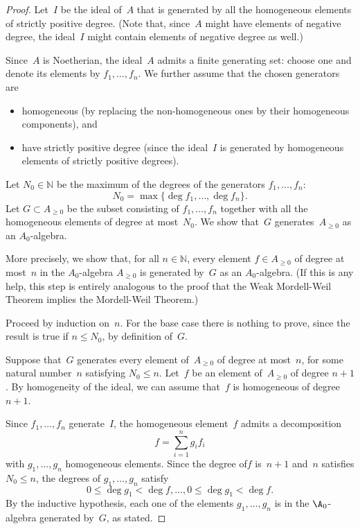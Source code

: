 \documentclass[english]{amsart}
\newcommand{\N}{\mathbb{N}}
\newcommand{\Az}{A_{\geq0}}
\begin{document}
\begin{proof}
Let~$I$ be the ideal of~$A$ that is generated by all the homogeneous elements of strictly positive degree.  (Note that, since~$A$ might have elements of negative degree, the ideal~$I$ might contain elements of negative degree as well.)

Since~$A$ is Noetherian, the ideal~$A$ admits a finite generating set: choose one and denote its elements by $f_1, \ldots , f_n$.  We further assume that the chosen generators are
\begin{itemize}
\item
homogeneous (by replacing the non-homogeneous ones by their homogeneous components), and
\item
have strictly positive degree (since the ideal~$I$ is generated by homogeneous elements of strictly positive degrees).
\end{itemize}
Let $N_0 \in \N$ be the maximum of the degrees of the generators $f_1, \ldots , f_n$:
\[
N_0 = \max \{ \deg f_1 , \ldots , \deg f_n \}.
\]
Let $G \subset \Az$ be the subset consisting of $f_1, \ldots , f_n$ together with all the homogeneous elements of degree at most~$N_0$.  We show that~$G$ generates~$\Az$ as an $A_0$-algebra.

More precisely, we show that, for all $n \in \N$, every element $f \in \Az$ of degree at most~$n$ in the $A_0$-algebra $\Az$ is generated by~$G$ as an $A_0$-algebra. (If this is any help, this step is entirely analogous to the proof that the Weak Mordell-Weil Theorem implies the Mordell-Weil Theorem.)

Proceed by induction on~$n$.  For the base case there is nothing to prove, since the result is true if $n \leq N_0$, by definition of~$G$.

Suppose that~$G$ generates every element of~$\Az$ of degree at most~$n$, for some natural number~$n$ satisfying $N_0 \le n$.  Let~$f$ be an element of~$\Az$ of degree $n+1$.  By homogeneity of the ideal, we can assume that~$f$ is homogeneous of degree~$n+1$.

Since $f_1, \ldots, f_n$ generate~$I$, the homogeneous element~$f$ admits a decomposition
\[
f = \sum_{i = 1}^n g_i f_i
\]
with $g_1, \ldots, g_n$ homogeneous elements.  Since the degree of$f$ is~$n+1$ and~$n$ satisfies $N_0 \le n$, the degrees of $g_1, \ldots , g_n$ satisfy
\[
0 \le \deg g_1 < \deg f, \ldots , 0 \le \deg g_1 < \deg f.
\]
By the inductive hypothesis, each one of the elements $g_1, \ldots , g_n$ is in the $\A_0$-algebra generated by~$G$, as stated.


\end{proof}
\end{document}
